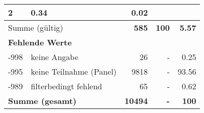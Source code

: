 \begin{longtable}{lXrrr}
       \num{2} &
       \num[round-mode=places,round-precision=2]{0,34} &
         \num[round-mode=places,round-precision=2]{0,02} \\
     \midrule
     \multicolumn{2}{l}{Summe (gültig)} &
       \textbf{\num{585}} &
     \textbf{100} &
       \textbf{\num[round-mode=places,round-precision=2]{5,57}} \\
     \multicolumn{5}{l}{\textbf{Fehlende Werte}}\\
       -998 &
       keine Angabe &
         \num{26} &
        - &
         \num[round-mode=places,round-precision=2]{0,25} \\
       -995 &
       keine Teilnahme (Panel) &
         \num{9818} &
        - &
         \num[round-mode=places,round-precision=2]{93,56} \\
       -989 &
       filterbedingt fehlend &
         \num{65} &
        - &
         \num[round-mode=places,round-precision=2]{0,62} \\
     \midrule
     \multicolumn{2}{l}{\textbf{Summe (gesamt)}} &
          \textbf{\num{10494}} &
        \textbf{-} &
        \textbf{100} \\
     \bottomrule
     \end{longtable}
     
